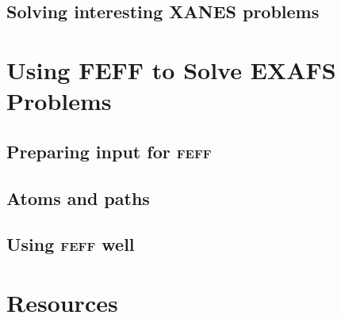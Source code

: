 \documentclass[10pt, xcolor=x11names, compress]{beamer}
\begin{document}

\subsection[Interesting XANES Problems]{Solving interesting XANES problems}




\section[EXAFS]{Using FEFF to Solve EXAFS Problems}
\subsection[\textsc{feff} input]{Preparing input for \textsc{feff}}

\subsection[Atoms and paths]{Atoms and paths}

\subsection[Good practice]{Using \textsc{feff} well}




\section[Resources]{Resources}

\end{document}
